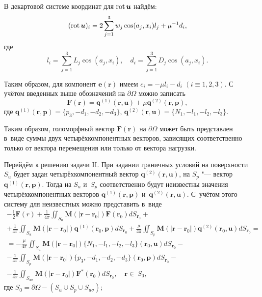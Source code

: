 В декартовой системе координат для $\mathop{\rm rot} \boldsymbol u$ найдём:
$$(\mathop{\rm rot} \boldsymbol u)_{i}=2\sum_{j=1}^{3}w_{j}\cos(a_{j}, x_{i})l_{j}+\mu^{-1}d_{i},$$
где
$$l_{i}=\sum_{j=1}^{3}L_{j}\cos(a_{j}, x_{i}),\quad 
d_{i}=\sum_{j=1}^{3}D_{j}\cos(a_{j}, x_{i}).$$

Таким образом, для компонент $\boldsymbol {e}(\boldsymbol {r})$ имеем $e_{i}=-\mu l_{i}-d_{i}$
$(i\equiv 1, 2, 3).$
С учётом введенных выше обозначений на $\partial \Omega$ можно записать
\begin{equation*}
\boldsymbol F(\boldsymbol r)=\boldsymbol {q}^{(1)}(\boldsymbol{r}, \boldsymbol {u})+\mu \boldsymbol {q}^{(2)}(\boldsymbol {r},
 \boldsymbol {p}),
\end{equation*}
где
$\boldsymbol {q}^{(1)}(\boldsymbol{r}, \boldsymbol{p})=\{p_{3}, -d_{1}, -d_{2}, -d_{3}\}$,
$\boldsymbol {q}^{(2)}(\boldsymbol{r}, \boldsymbol{u})=\{N_{1}, -l_{1}, -l_{2}, -l_{3}\}$.

Таким образом, голоморфный вектор $\boldsymbol F(\boldsymbol r)$ на $\partial \Omega$ может быть представлен в~виде суммы двух четырёхкомпонентных векторов, зависящих соответственно только от вектора перемещения или только от вектора нагрузки.

Перейдём к решению задачи {\sc II}. При  задании граничных условий на поверхности $S_{u}$ будет задан четырёхкомпонентный вектор 
$\boldsymbol {q}^{(2)}(\boldsymbol r, \boldsymbol u)$,  на $S_{p}$ "--- вектор $\boldsymbol {q}^{(1)}(\boldsymbol {r,p})$. 
Тогда на $S_{u}$ и~$S_{p}$ соответственно будут неизвестны  значения  четырёхкомпонентных векторов  
$\boldsymbol q^{(1)}(\boldsymbol r, \boldsymbol p)$  и~$\boldsymbol{q}^{(2)}(\boldsymbol r, \boldsymbol u)$. 
С~учётом этого систему для неизвестных можно представить  в~виде 
\begin{multline}
-\frac{1}{2}\boldsymbol F(r)+\frac{1}{4\pi}
\iint_{ S_0}  
\boldsymbol M(|\boldsymbol{r}-\boldsymbol{r}_{0}|)
\boldsymbol{F}(\boldsymbol{r}_{0})dS_{\boldsymbol r_0}+\\
+
\frac{1}{4\pi}\iint_{ S_u}  
\boldsymbol M(|\boldsymbol{r}-\boldsymbol{r}_{0}|)\boldsymbol{q}^{(1)}(\boldsymbol{r}_{0},\boldsymbol p)  dS_{\boldsymbol r_{0}}  
 +    
 \frac{\mu}{4\pi}\iint_{ S_{p}}  \boldsymbol M(|\boldsymbol{r}-\boldsymbol{r}_{0}|)\boldsymbol{q}^{(2)}(\boldsymbol{r}_{0},\boldsymbol u)  dS_{\boldsymbol r_{0}} =
 \\
 = -
  \frac{\mu}{4\pi}\iint_{ S_{u}}  \boldsymbol M(|\boldsymbol{r}-\boldsymbol{r}_{0}|) \{N_{1}, -l_{1}, -l_{2}, -l_{3}\}(\boldsymbol{r}_{0},\boldsymbol u)  dS_{\boldsymbol r_{0}} -
  \\
  -\frac{1}{4\pi}\iint_{ S_{p}} \boldsymbol M(|\boldsymbol{r}-\boldsymbol{r}_{0}|)
  \{p_{3}, -d_{1}, -d_{2}, -d_{3}\}(\boldsymbol{r}_{0},\boldsymbol p)  dS_{\boldsymbol r_{0}}-
  \\
  -
 \frac{1}{4\pi}\iint_{ S_{u\sigma}}  \boldsymbol M(|\boldsymbol{r}-\boldsymbol{r}_{0}|)\boldsymbol{F}^{*}
 (\boldsymbol{r}_{0})dS_{\boldsymbol r_{0}}, \quad \boldsymbol  r\in\ S_{0}, 
 \end{multline}
 где $S_{0}=\partial\Omega - (S_{u}\cup{S_{p}}\cup{S_{u\sigma}})$;

